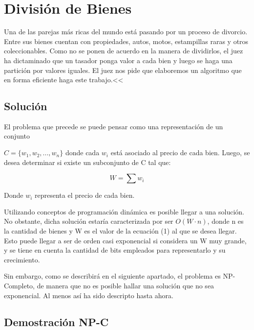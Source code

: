 \section{División de Bienes}

Una de las parejas más ricas del mundo está pasando por un proceso de divorcio. Entre sus bienes cuentan con propiedades, autos, motos, estampillas raras y otros coleccionables. Como no se ponen de acuerdo en la manera de dividirlos, el juez ha dictaminado que un tasador ponga valor a cada bien y luego se haga una partición por valores iguales. El juez nos pide que elaboremos un algoritmo que en forma eficiente haga este trabajo.<<\newline

\subsection{Solución}
El problema que precede se puede pensar como una representación de un conjunto

$C=\{w_{1}, w_{2}, ..., w_{n}\}$ donde cada $w_{i}$ está asociado al precio de cada bien. Luego, se desea determinar si existe un subconjunto de C tal que:

\begin{equation}
    W=\sum w_{i}
\end{equation}

Donde $w_{i}$ representa el precio de cada bien.

Utilizando conceptos de programación dinámica es posible llegar a una solución. No obstante, dicha solución estaría caracterizada por ser $O(W\cdot n)$, donde n es la cantidad de bienes y W es el valor de la ecuación (1) al que se desea llegar. Esto puede llegar a ser de orden casi exponencial si considera un W muy grande, y se tiene en cuenta la cantidad de bits empleados para representarlo y su crecimiento.

Sin embargo, como se describirá en el siguiente apartado, el problema es NP-Completo, de manera que no es posible hallar una solución que no sea exponencial. Al menos así ha sido descripto hasta ahora.

\subsection{Demostración NP-C}
